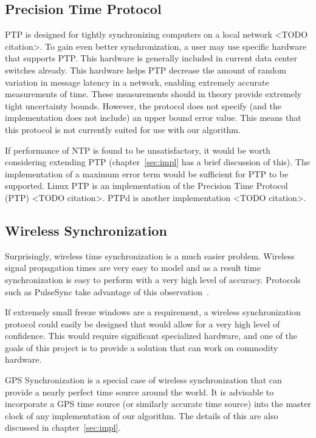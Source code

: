 \subsection{Precision Time Protocol}

PTP is designed for tightly synchronizing computers on a local network
<TODO citation>. To gain even better synchronization, a user may use
specific hardware that supports PTP. This hardware is generally
included in current data center switches already. This hardware helps
PTP decrease the amount of random variation in message latency in a
network, enabling extremely accurate measurements of time. These
measurements should in theory provide extremely tight uncertainty
bounds. However, the protocol does not specify (and the implementation
does not include) an upper bound error value. This means that this
protocol is not currently suited for use with our algorithm.

If performance of NTP is found to be unsatisfactory, it would be worth
considering extending PTP (chapter~\ref{sec:impl} has a brief discussion
of this). The implementation of a maximum error term would be
sufficient for PTP to be supported. Linux PTP is an implementation of
the Precision Time Protocol (PTP) <TODO citation>. PTPd is another
implementation <TODO citation>.

\subsection{Wireless Synchronization}

Surprisingly, wireless time synchronization is a much easier
problem. Wireless signal propagation times are very easy to model and
as a result time synchronization is easy to perform with a very high
level of accuracy. Protocols such as PulseSync take advantage of this
observation~\citep{Lenzen2010}.

If extremely small freeze windows are a requirement, a wireless
synchronization protocol could easily be designed that would allow for
a very high level of confidence. This would require significant
specialized hardware, and one of the goals of this project is to
provide a solution that can work on commodity hardware. 

GPS Synchronization is a special case of wireless synchronization that
can provide a nearly perfect time source around the world. It is
advisable to incorporate a GPS time source (or similarly accurate time
source) into the master clock of any implementation of our
algorithm. The details of this are also discussed in
chapter~\ref{sec:impl}.

